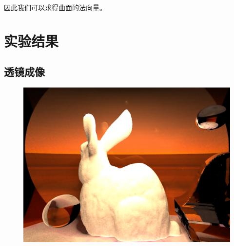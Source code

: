 \documentclass{article}
\begin{document}
因此我们可以求得曲面的法向量。












\section{实验结果}

\subsection{透镜成像}

\begin{figure}[H]
\includegraphics[width=\columnwidth]{1.png}
\end{figure}
\end{document}
